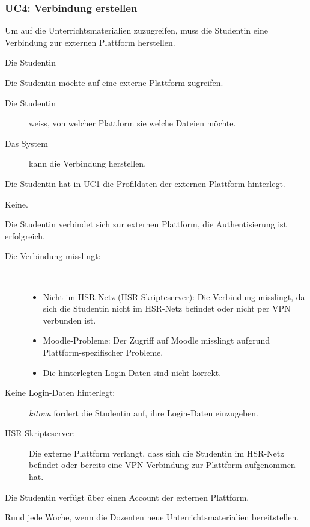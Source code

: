 \documentclass[a4paper]{article}
\begin{document}
\subsubsection{UC4: Verbindung erstellen}
\begin{description}[uclist]
  \item[Goal] Um auf die Unterrichtsmaterialien zuzugreifen, muss die Studentin eine Verbindung zur externen Plattform herstellen.
  \item[Primary Actor] Die Studentin
  \item[Trigger] Die Studentin möchte auf eine externe Plattform zugreifen.
  \item[Stakeholders and Interests]
    \begin{description}
      \item[Die Studentin] weiss, von welcher Plattform sie welche Dateien möchte.
      \item[Das System] kann die Verbindung herstellen.
    \end{description}
  \item[Preconditions] Die Studentin hat in UC1 die Profildaten der externen Plattform hinterlegt.
  \item[Postconditions] Keine.
  \item[Main Success Scenario] Die Studentin verbindet sich zur externen Plattform, die Authentisierung ist erfolgreich.
  \item[Extensions]
    \begin{description}
      \item[Die Verbindung misslingt:] \strut \\[-1em]
        \begin{itemize}[leftmargin=1em]
          \item Nicht im HSR-Netz (HSR-Skripteserver): Die Verbindung misslingt, da sich die Studentin nicht im HSR-Netz befindet oder nicht per VPN verbunden ist.
          \item Moodle-Probleme: Der Zugriff auf Moodle misslingt aufgrund Plattform-spezifischer Probleme.
          \item Die hinterlegten Login-Daten sind nicht korrekt.
        \end{itemize}
      \item[Keine Login-Daten hinterlegt:] \emph{kitovu} fordert die Studentin auf, ihre Login-Daten einzugeben.
      \item[HSR-Skripteserver:] Die externe Plattform verlangt, dass sich die Studentin im HSR-Netz befindet oder bereits eine VPN-Verbindung zur Plattform aufgenommen hat.
    \end{description}
  \item[Special Requirements] Die Studentin verfügt über einen Account der externen Plattform.
  \item[Frequency of Occurrence] Rund jede Woche, wenn die Dozenten neue Unterrichtsmaterialien bereitstellen.
\end{description}
\end{document}
